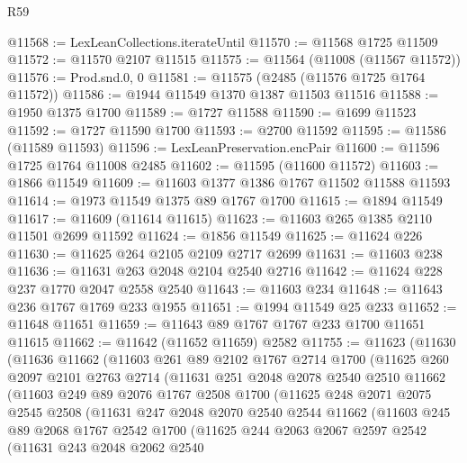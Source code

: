 \begin{lexlean}{R59}
\begin{coremodule}
@11568 := LexLeanCollections.iterateUntil
@11570 := @11568 @1725 @11509
@11572 := @11570 @2107 @11515
@11575 := @11564 (@11008 (@11567 @11572))
@11576 := Prod.snd.{0, 0}
@11581 := @11575 (@2485 (@11576 @1725 @1764 @11572))
@11586 := @1944 @11549 @1370 @1387 @11503 @11516
@11588 := @1950 @1375 @1700
@11589 := @1727 @11588
@11590 := @1699 @11523
@11592 := @1727 @11590 @1700
@11593 := @2700 @11592
@11595 := @11586 (@11589 @11593)
@11596 := LexLeanPreservation.encPair
@11600 := @11596 @1725 @1764 @11008 @2485
@11602 := @11595 (@11600 @11572)
@11603 := @1866 @11549
@11609 := @11603 @1377 @1386 @1767 @11502 @11588 @11593
@11614 := @1973 @11549 @1375 @89 @1767 @1700
@11615 := @1894 @11549
@11617 := @11609 (@11614 @11615)
@11623 := @11603 @265 @1385 @2110 @11501 @2699 @11592
@11624 := @1856 @11549
@11625 := @11624 @226
@11630 := @11625 @264 @2105 @2109 @2717 @2699
@11631 := @11603 @238
@11636 := @11631 @263 @2048 @2104 @2540 @2716
@11642 := @11624 @228 @237 @1770 @2047 @2558 @2540
@11643 := @11603 @234
@11648 := @11643 @236 @1767 @1769 @233 @1955
@11651 := @1994 @11549 @25 @233
@11652 := @11648 @11651
@11659 := @11643 @89 @1767 @1767 @233 @1700 @11651 @11615
@11662 := @11642 (@11652 @11659) @2582
@11755 := @11623
    (@11630
      (@11636
        @11662
        (@11603
          @261
          @89
          @2102
          @1767
          @2714
          @1700
          (@11625
            @260
            @2097
            @2101
            @2763
            @2714
            (@11631
              @251
              @2048
              @2078
              @2540
              @2510
              @11662
              (@11603
                @249
                @89
                @2076
                @1767
                @2508
                @1700
                (@11625
                  @248
                  @2071
                  @2075
                  @2545
                  @2508
                  (@11631
                    @247
                    @2048
                    @2070
                    @2540
                    @2544
                    @11662
                    (@11603
                      @245
                      @89
                      @2068
                      @1767
                      @2542
                      @1700
                      (@11625
                        @244
                        @2063
                        @2067
                        @2597
                        @2542
                        (@11631
                          @243
                          @2048
                          @2062
                          @2540

\end{coremodule}
\end{lexlean}
